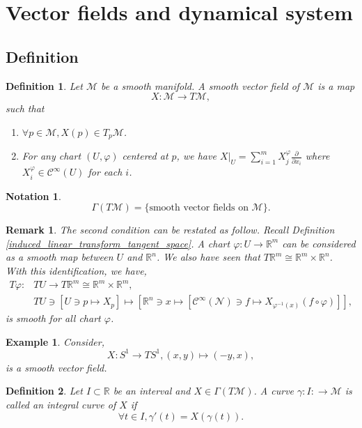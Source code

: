 \documentclass[10pt]{article}
\newtheorem{definition}{Definition}[section]
\newtheorem{notation}{Notation}[section]
\newtheorem{remark}{Remark}[section]
\newtheorem{example}{Example}[section]
\newcommand{\R}[0]{\mathbb{R}}
\newcommand{\M}[0]{\mathcal{M}}
\newcommand{\maniN}[0]{\mathcal{N}}
\newcommand{\cinf}[0]{\mathcal{C}^\infty}
\newcommand{\pd}[2]{{\frac {\partial #1} {\partial #2}}}
\begin{document}
\section{Vector fields and dynamical system}
\subsection{Definition}
\begin{definition}
  Let $\M$ be a smooth manifold. A smooth vector field of $\M$ is a map 
  \begin{equation*}
    X:\M\to T\M,
  \end{equation*}
  such that 
  \begin{enumerate}
    \item $\forall p\in\M, X(p)\in T_p\M$. 
    \item For any chart $(U,\varphi)$ centered at $p$, we have $X|_U=\sum_{i=1}^mX_j^\varphi\pd{}{x_i}$ where $X_i^\varphi\in\cinf(U)$ for each $i$.
  \end{enumerate}
\end{definition}
\begin{notation}
  \begin{equation*}
    \Gamma(T\M) = \{\text{smooth vector fields on $\M$}\}.
  \end{equation*}
\end{notation}
\begin{remark}
  The second condition can be restated as follow. Recall Definition \ref{induced_linear_transform_tangent_space}. A chart $\varphi:U\to \R^m$ can be considered as a smooth map between $U$ and $\R^n$. 
  We also have seen that $T\R^m \cong \R^m\times\R^n$. With this identification, we have,
  \begin{align*}
    T\varphi:&TU\to T\R^m \cong \R^m\times\R^m,\\
    &TU\ni [U\ni p\mapsto X_p]\mapsto [\R^n \ni x \mapsto [\cinf(\maniN)\ni f\mapsto X_{\varphi^{-1}(x)}(f\circ\varphi)]],
  \end{align*}
  is smooth for all chart $\varphi$.
\end{remark}
\begin{example}
  Consider,
  \begin{equation*}
    X:S^1\to TS^1, (x,y)\mapsto (-y,x),
  \end{equation*}
  is a smooth vector field.
\end{example}
\begin{definition}
  Let $I\subset\R$ be an interval and $X\in\Gamma(T\M)$. A curve $\gamma:I:\to\M$ is called an integral curve of $X$ if 
  \begin{equation*}
    \forall t\in I, \gamma'(t) = X(\gamma(t)).
  \end{equation*}
\end{definition}
\end{document}
